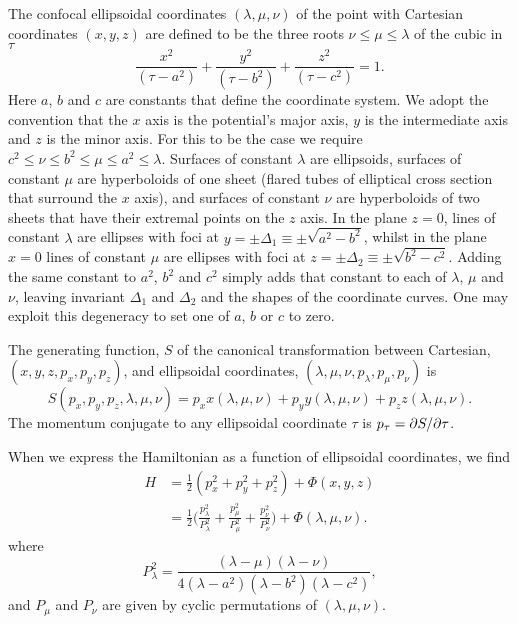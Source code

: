 \documentclass[useAMS,usenatbib,fleqn,a4paper]{mn2e}
\def\half{{\textstyle{\frac12}}}
\begin{document}
The confocal ellipsoidal coordinates $(\lambda,\mu,\nu)$ of the point with
Cartesian coordinates $(x,y,z)$ are defined to be the three roots
$\nu\le\mu\le\lambda$ of the
cubic in $\tau$
\begin{equation}
\frac{x^2}{(\tau-a^2)}+\frac{y^2}{(\tau-b^2)}+\frac{z^2}{(\tau-c^2)} = 1.
\end{equation}
 Here $a$, $b$ and $c$ are constants that define the coordinate system. We
adopt the convention that the $x$ axis is the potential's major axis,
$y$ is the intermediate axis and $z$ is the minor axis. For this to be the
case we require
$c^2\leq\nu\leq b^2\leq\mu\leq a^2\leq\lambda$. Surfaces of constant
$\lambda$ are ellipsoids, surfaces of constant $\mu$ are hyperboloids of one
sheet (flared tubes of elliptical cross section that surround the $x$ axis),
and surfaces of constant $\nu$ are hyperboloids of two sheets that have their
extremal points on the $z$ axis. In the plane $z=0$, lines of constant
$\lambda$ are ellipses with foci at $y=\pm\Delta_1\equiv\pm\sqrt{a^2-b^2}$,
whilst in the plane $x=0$ lines of constant $\mu$ are ellipses with foci at
$z=\pm\Delta_2\equiv\pm\sqrt{b^2-c^2}$. Adding the same constant to $a^2$,
$b^2$ and $c^2$ simply adds that constant to each of $\lambda$, $\mu$ and
$\nu$, leaving invariant $\Delta_1$ and $\Delta_2$ and the shapes of the
coordinate curves. One may exploit this degeneracy to set one of $a$, $b$ or
$c$ to zero.

 The generating function, $S$ of the canonical transformation between Cartesian,
$(x,y,z,p_x,p_y,p_z)$, and ellipsoidal coordinates,
$(\lambda,\mu,\nu,p_\lambda,p_\mu,p_\nu)$ is
\begin{equation}
S(p_x,p_y,p_z,\lambda,\mu,\nu) = p_x x(\lambda,\mu,\nu)
+p_y y(\lambda,\mu,\nu)
+p_z z(\lambda,\mu,\nu).
\end{equation}
The momentum conjugate to any ellipsoidal coordinate $\tau$ is $p_\tau =
\partial S/\partial \tau$.

When we express the Hamiltonian as a function of
ellipsoidal coordinates, we find
\begin{equation}
\begin{split}
H &= \half(p_x^2+p_y^2+p_z^2)+\Phi(x,y,z)
\\&=\half\Big(\frac{p_\lambda^2}{P_\lambda^2}+\frac{p_\mu^2}{P_\mu^2}+\frac{p_\nu^2}{P_\nu^2}\Big)+\Phi(\lambda,\mu,\nu).
\end{split}
\label{Eq::Hamiltonian}
\end{equation}
where
\begin{equation}
P^2_\lambda = \frac{(\lambda-\mu)(\lambda-\nu)}{4(\lambda-a^2)(\lambda-b^2)(\lambda-c^2)},
\end{equation}
and $P_\mu$ and $P_\nu$ are given by cyclic permutations of $(\lambda,\mu,\nu)$.
\end{document}
